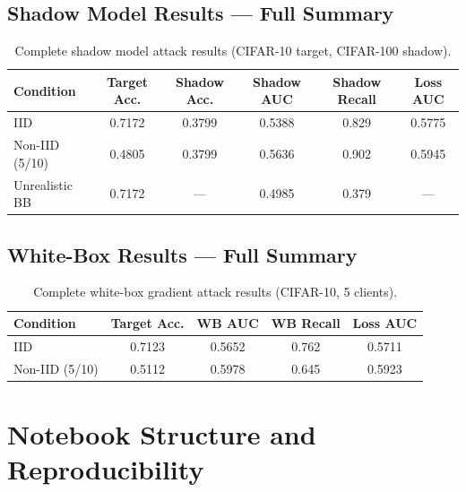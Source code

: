 \documentclass[12pt, a4paper]{report}
\begin{document}
\section{Shadow Model Results --- Full Summary}
\begin{table}[H]
  \centering
  \caption{Complete shadow model attack results (CIFAR-10 target, CIFAR-100 shadow).}
  \begin{tabular}{lccccc}
    \toprule
    \textbf{Condition} & \textbf{Target Acc.} & \textbf{Shadow Acc.} & \textbf{Shadow AUC} & \textbf{Shadow Recall} & \textbf{Loss AUC} \\
    \midrule
    IID             & 0.7172 & 0.3799 & 0.5388 & 0.829 & 0.5775 \\
    Non-IID (5/10)  & 0.4805 & 0.3799 & 0.5636 & 0.902 & 0.5945 \\
    \midrule
    Unrealistic BB  & 0.7172 & ---    & 0.4985 & 0.379 & --- \\
    \bottomrule
  \end{tabular}
\end{table}

\section{White-Box Results --- Full Summary}
\begin{table}[H]
  \centering
  \caption{Complete white-box gradient attack results (CIFAR-10, 5 clients).}
  \begin{tabular}{lcccc}
    \toprule
    \textbf{Condition} & \textbf{Target Acc.} & \textbf{WB AUC} & \textbf{WB Recall} & \textbf{Loss AUC} \\
    \midrule
    IID             & 0.7123 & 0.5652 & 0.762 & 0.5711 \\
    Non-IID (5/10)  & 0.5112 & 0.5978 & 0.645 & 0.5923 \\
    \bottomrule
  \end{tabular}
\end{table}

\chapter{Notebook Structure and Reproducibility}
\label{app:notebooks}
\end{document}
